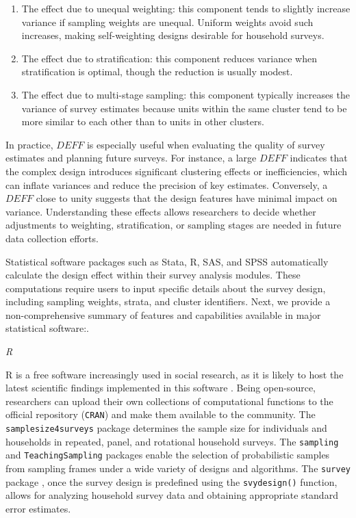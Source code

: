 \documentclass[
  12pt,
]{book}
\providecommand{\tightlist}{%
  \setlength{\itemsep}{0pt}\setlength{\parskip}{0pt}}
\begin{document}
\begin{enumerate}
\def\labelenumi{\arabic{enumi}.}
\tightlist
\item
  The effect due to unequal weighting: this component tends to slightly increase variance if sampling weights are unequal. Uniform weights avoid such increases, making self-weighting designs desirable for household surveys.
\item
  The effect due to stratification: this component reduces variance when stratification is optimal, though the reduction is usually modest.
\item
  The effect due to multi-stage sampling: this component typically increases the variance of survey estimates because units within the same cluster tend to be more similar to each other than to units in other clusters.
\end{enumerate}

In practice, \(DEFF\) is especially useful when evaluating the quality of survey estimates and planning future surveys. For instance, a large \(DEFF\) indicates that the complex design introduces significant clustering effects or inefficiencies, which can inflate variances and reduce the precision of key estimates. Conversely, a \(DEFF\) close to unity suggests that the design features have minimal impact on variance. Understanding these effects allows researchers to decide whether adjustments to weighting, stratification, or sampling stages are needed in future data collection efforts.

Statistical software packages such as Stata, R, SAS, and SPSS automatically calculate the design effect within their survey analysis modules. These computations require users to input specific details about the survey design, including sampling weights, strata, and cluster identifiers. Next, we provide a non-comprehensive summary of features and capabilities available in major statistical software:.

\emph{R}

R is a free software increasingly used in social research, as it is likely to host the latest scientific findings implemented in this software \citep{R_2024}. Being open-source, researchers can upload their own collections of computational functions to the official repository (\texttt{CRAN}) and make them available to the community. The \texttt{samplesize4surveys} package \citep{ss4s} determines the sample size for individuals and households in repeated, panel, and rotational household surveys. The \texttt{sampling} \citep{Yves} and \texttt{TeachingSampling} \citep{TS} packages enable the selection of probabilistic samples from sampling frames under a wide variety of designs and algorithms. The \texttt{survey} package \citep{TL}, once the survey design is predefined using the \texttt{svydesign()} function, allows for analyzing household survey data and obtaining appropriate standard error estimates.
\end{document}
